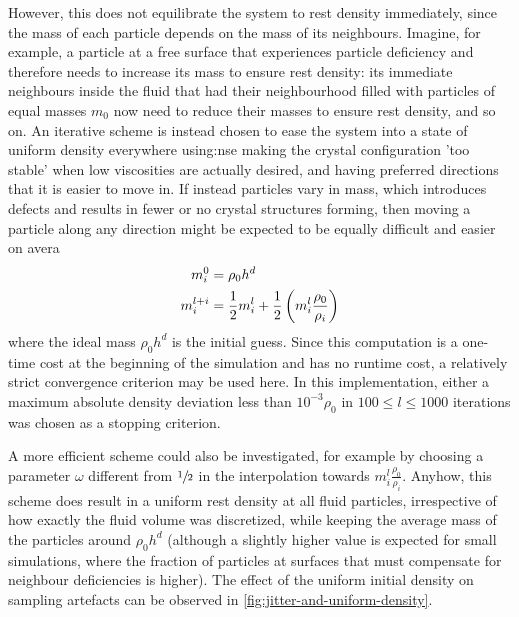 However, this does not equilibrate the system  to rest density immediately, since the mass of each particle depends on the mass of its neighbours. Imagine, for example, a particle at a free surface that experiences particle deficiency and therefore needs to increase its mass to ensure rest density: its immediate neighbours inside the fluid that had their neighbourhood filled with particles of equal masses $m_0$ now need to reduce their masses to ensure rest density, and so on. An iterative scheme is instead chosen to ease the system into a state of uniform density everywhere using:nse making the crystal configuration 'too stable' when low viscosities are actually desired, and having preferred directions that it is easier to move in. If instead particles vary in mass, which introduces defects and results in fewer or no crystal structures forming, then moving a particle along any direction might be expected to be equally difficult and easier on avera
\begin{align}
  m_i^0     & = \rho_0 h^d                                                     \\
  m_i^{l+i} & = \frac{1}{2}m_i^l + \frac{1}{2}\left(m_i^l \frac{\rho_0}{\rho_i}\right)
\end{align}
where the ideal mass $\rho_0 h^d$ is the initial guess. Since this computation is a one-time cost at the beginning of the simulation and has no runtime cost, a relatively strict convergence criterion may be used here. In this implementation, either a maximum absolute density deviation less than $10^{-3}\rho_0$ in $100\leq l \leq 1000$ iterations was chosen as a stopping criterion.


A more efficient scheme could also be investigated, for example by choosing a parameter $\omega$ different from $\sfrac{1}{2}$ in the interpolation towards $m_i^l \frac{\rho_0}{\rho_i}$. Anyhow, this scheme does result in a uniform rest density at all fluid particles, irrespective of how exactly the fluid volume was discretized, while keeping the average mass of the particles around $\rho_0 h^d$ (although a slightly higher value is expected for small simulations, where the fraction of particles at surfaces that must compensate for neighbour deficiencies is higher). The effect of the uniform initial density on sampling artefacts can be observed in \autoref{fig:jitter-and-uniform-density}.


